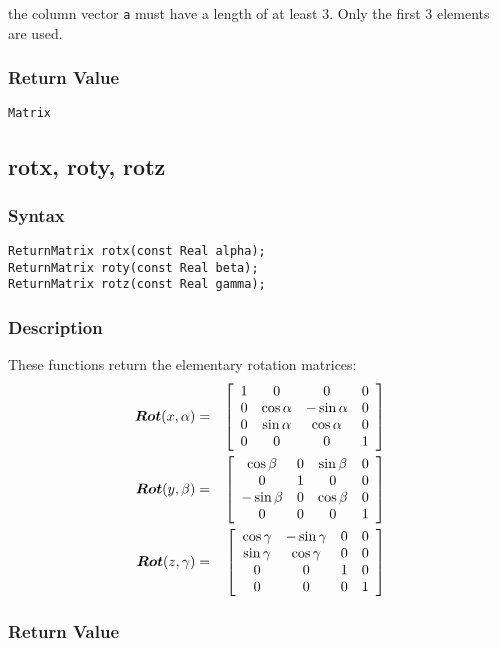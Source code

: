 \documentclass[dvips,11pt,fleqn]{report}
\newcommand{\mbold}[1]{\mbox{\boldmath $ #1 $}}
\newcommand{\matr}[2]{\left[\begin{array}{#1} #2 \end{array}\right]}
\begin{document}
 the column vector {\tt a} must have a length of at least 3. 
Only the first 3 elements are used.

\subsubsection*{Return Value}

{\tt Matrix}

\newpage

\subsection*{rotx, roty, rotz}

\subsubsection*{Syntax}
\begin{verbatim}
ReturnMatrix rotx(const Real alpha);
ReturnMatrix roty(const Real beta);
ReturnMatrix rotz(const Real gamma);
\end{verbatim}
\subsubsection*{Description}
These functions return the elementary rotation matrices:
\begin{eqnarray}
\mbold{Rot}(x,\alpha) & = & 
\matr{cccc}{
1 & 0 & 0 & 0 \\
0 & \cos \alpha & - \sin \alpha & 0 \\
0 & \sin \alpha & \cos \alpha & 0 \\
0 & 0 & 0 & 1
} \\
\mbold{Rot}(y,\beta) & = & 
\matr{cccc}{
\cos \beta & 0 & \sin \beta & 0\\
0 & 1 & 0 & 0 \\
- \sin \beta & 0 & \cos \beta & 0 \\
0 & 0 & 0 & 1
} \\
\mbold{Rot}(z,\gamma) & = & 
\matr{cccc}{
\cos \gamma & - \sin \gamma & 0 & 0 \\
\sin \gamma & \cos \gamma & 0 & 0 \\
0 & 0 & 1 & 0 \\
0 & 0 & 0 & 1
}
\end{eqnarray}


\subsubsection*{Return Value}
\end{document}
